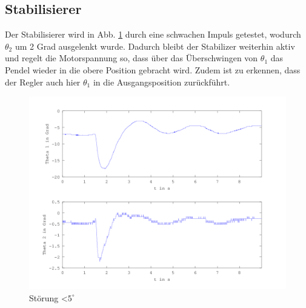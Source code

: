 \subsection{Stabilisierer}

Der Stabilisierer wird in Abb. \ref{fig.Stabilisierer-Plot} durch eine schwachen Impuls getestet, wodurch $\theta_2$ um 2 Grad ausgelenkt wurde. Dadurch bleibt der Stabilizer weiterhin aktiv und regelt die Motorspannung so, dass über das Überschwingen von $ \theta_1$ das Pendel wieder in die obere Position gebracht wird. Zudem ist zu erkennen, dass der Regler auch hier $ \theta_1$ in die Ausgangsposition zurückführt.

\begin{figure}[htbp]
	\centering
	\includegraphics[width=1.\textwidth]{Grafiken/Stab_lang.png}
	\caption{Störung \textless $5^{\circ}$}
	\label{fig.Stabilisierer-Plot}
\end{figure}


